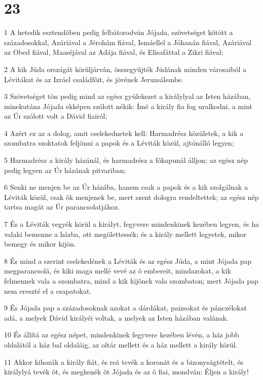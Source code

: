 \chapter{23}

\par 1 A hetedik esztendõben pedig felbátorodván Jójada, szövetséget kötött a századosokkal, Azáriával a Jérohám fiával, Ismáellel a Jóhanán fiával, Azáriával az Obed fiával, Maaséjával az Adája fiával, és Elisafáttal a Zikri fiával;
\par 2 A kik Júda országát körüljárván, összegyûjték Júdának minden városaiból a Lévitákat és az Izráel családfõit, és jövének Jeruzsálembe.
\par 3 Szövetséget tõn pedig mind az egész gyülekezet a királylyal az Isten házában, minekutána Jójada ekképen szólott nékik: Ímé a király fia fog uralkodni, a mint az Úr szólott volt a Dávid fiairól;
\par 4 Azért ez az a dolog, amit cselekednetek kell: Harmadrész közületek, a kik a szombatra szoktatok feljönni a papok és a Léviták közül, ajtónálló legyen;
\par 5 Harmadrész a király házánál, és harmadrész a fõkapunál álljon; az egész nép pedig legyen az Úr házának pitvariban;
\par 6 Senki ne menjen be az Úr házába, hanem csak a papok és a kik szolgálnak a Léviták közül, csak õk menjenek be, mert szent dologra rendeltettek; az egész nép tartsa magát az Úr parancsolatjához.
\par 7 És a Léviták vegyék körül a királyt, fegyvere mindenkinek kezében legyen, és ha valaki bemenne a házba, ott megölettessék; és a király mellett legyetek, mikor bemegy és mikor kijön.
\par 8 És mind a szerint cselekedének a Léviták és az egész Júda, a mint Jójada pap megparancsolá, és kiki maga mellé vevé az õ embereit, mindazokat, a kik felmennek vala a szombatra, mind a kik kijõnek vala szombaton; mert Jójada pap nem ereszté el a csapatokat.
\par 9 És Jójada pap a századosoknak azokat a dárdákat, paizsokat és pánczélokat adá, a melyek Dávid királyéi voltak, a melyek az Isten házában valának.
\par 10 És állítá az egész népet, mindenkinek fegyvere kezében lévén, a ház jobb oldalától a ház bal oldaláig, az oltár mellett és a ház mellett a király körül.
\par 11 Akkor kihozák a király fiát, és reá tevék a koronát és a bizonyságtételt, és királylyá tevék õt, és megkenék õt Jójada és az õ fiai, mondván: Éljen a király!

